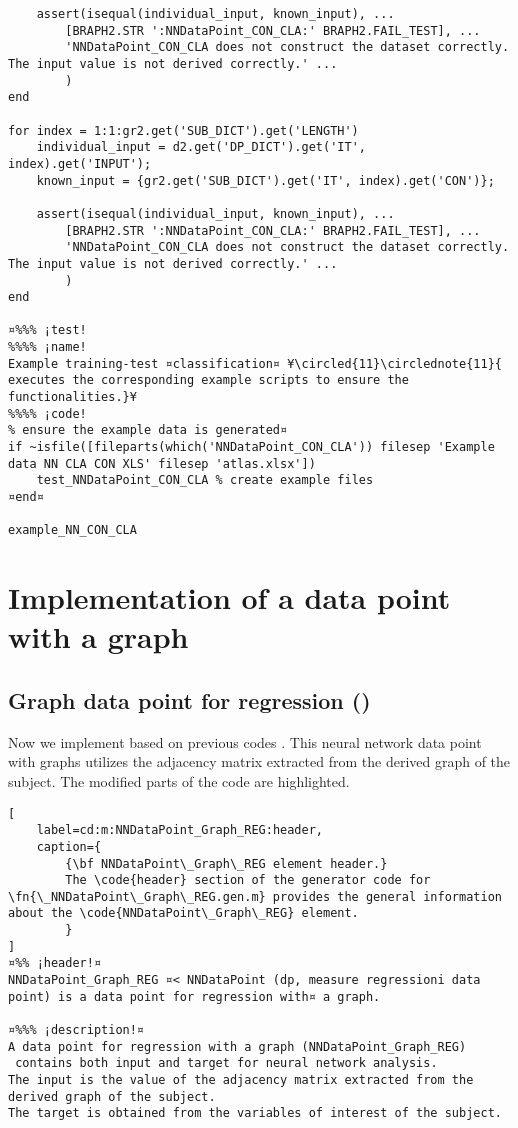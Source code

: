 \documentclass{tufte-handout}
\begin{document}
\begin{lstlisting}
    assert(isequal(individual_input, known_input), ...
        [BRAPH2.STR ':NNDataPoint_CON_CLA:' BRAPH2.FAIL_TEST], ...
        'NNDataPoint_CON_CLA does not construct the dataset correctly. The input value is not derived correctly.' ...
        )
end

for index = 1:1:gr2.get('SUB_DICT').get('LENGTH')
    individual_input = d2.get('DP_DICT').get('IT', index).get('INPUT');
    known_input = {gr2.get('SUB_DICT').get('IT', index).get('CON')};

    assert(isequal(individual_input, known_input), ...
        [BRAPH2.STR ':NNDataPoint_CON_CLA:' BRAPH2.FAIL_TEST], ...
        'NNDataPoint_CON_CLA does not construct the dataset correctly. The input value is not derived correctly.' ...
        )
end

¤%%% ¡test! 
%%%% ¡name!
Example training-test ¤classification¤ ¥\circled{11}\circlednote{11}{ executes the corresponding example scripts to ensure the functionalities.}¥
%%%% ¡code!
% ensure the example data is generated¤
if ~isfile([fileparts(which('NNDataPoint_CON_CLA')) filesep 'Example data NN CLA CON XLS' filesep 'atlas.xlsx'])
    test_NNDataPoint_CON_CLA % create example files
¤end¤

example_NN_CON_CLA

\end{lstlisting}

\clearpage

\section{Implementation of a data point with a graph}

\subsection{Graph data point for regression ()}

Now we implement  based on previous codes .
This neural network data point with graphs utilizes the adjacency matrix extracted from the derived graph of the subject. 
The modified parts of the code are highlighted.

\begin{lstlisting}[
	label=cd:m:NNDataPoint_Graph_REG:header,
	caption={
		{\bf NNDataPoint\_Graph\_REG element header.}
		The \code{header} section of the generator code for \fn{\_NNDataPoint\_Graph\_REG.gen.m} provides the general information about the \code{NNDataPoint\_Graph\_REG} element.
		}
]
¤%% ¡header!¤
NNDataPoint_Graph_REG ¤< NNDataPoint (dp, measure regressioni data point) is a data point for regression with¤ a graph.

¤%%% ¡description!¤
A data point for regression with a graph (NNDataPoint_Graph_REG) 
 contains both input and target for neural network analysis.
The input is the value of the adjacency matrix extracted from the derived graph of the subject.
The target is obtained from the variables of interest of the subject.
\end{lstlisting}
\end{document}
